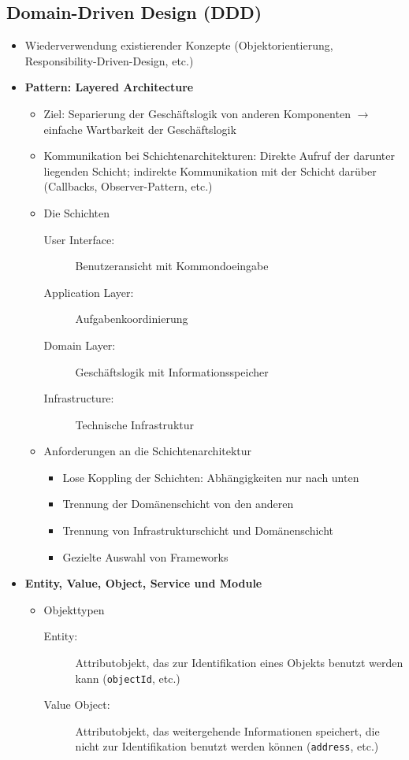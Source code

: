 \subsection{Domain-Driven Design (DDD)}
\begin{itemize}
	\item Wiederverwendung existierender Konzepte (Objektorientierung, Responsibility-Driven-Design, etc.)
	\item \textbf{Pattern: Layered Architecture}
	\begin{itemize}
		\item Ziel: Separierung der Geschäftslogik von anderen Komponenten \(\rightarrow\) einfache Wartbarkeit der Geschäftslogik
		\item Kommunikation bei Schichtenarchitekturen: Direkte Aufruf der darunter liegenden Schicht; indirekte Kommunikation mit der Schicht darüber (Callbacks, Observer-Pattern, etc.)
		\item Die Schichten
		\begin{description}
			\item[User Interface:] Benutzeransicht mit Kommondoeingabe
			\item[Application Layer:] Aufgabenkoordinierung
			\item[Domain Layer:] Geschäftslogik mit Informationsspeicher
			\item[Infrastructure:] Technische Infrastruktur
		\end{description}
		\item Anforderungen an die Schichtenarchitektur
		\begin{itemize}
			\item Lose Koppling der Schichten: Abhängigkeiten nur nach unten
			\item Trennung der Domänenschicht von den anderen
			\item Trennung von Infrastrukturschicht und Domänenschicht
			\item Gezielte Auswahl von Frameworks
		\end{itemize}
	\end{itemize}
	\item \textbf{Entity, Value, Object, Service und Module}
	\begin{itemize}
		\item Objekttypen
		\begin{description}
			\item[Entity:] Attributobjekt, das zur Identifikation eines Objekts benutzt werden kann (\texttt{objectId}, etc.)
			\item[Value Object:] Attributobjekt, das weitergehende Informationen speichert, die nicht zur Identifikation benutzt werden können (\texttt{address}, etc.)

\end{description}
\end{itemize}
\end{itemize}
